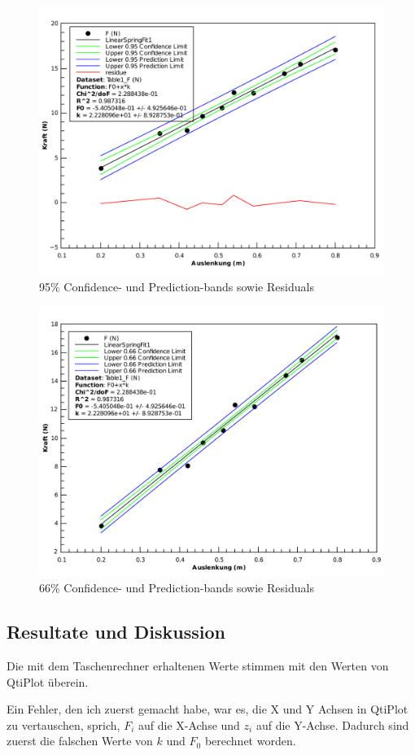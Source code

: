 \begin{figure}[H]
    \center
    \includegraphics[width=.8\textwidth]{qtiplot/feder-95-bands}
    \caption{95\% Confidence- und Prediction-bands sowie Residuals}
    \label{fig:feder-95-bands}
\end{figure}

\begin{figure}[H]
    \center
    \includegraphics[width=.8\textwidth]{qtiplot/feder-66-bands}
    \caption{66\% Confidence- und Prediction-bands sowie Residuals}
    \label{fig:feder-66-bands}
\end{figure}


\subsection{Resultate und Diskussion}

Die mit dem Taschenrechner erhaltenen Werte stimmen mit den Werten von QtiPlot \"uberein.

Ein Fehler, den ich zuerst gemacht habe, war es, die X und Y Achsen in QtiPlot zu vertauschen,
sprich, $F_i$ auf die X-Achse und $z_i$ auf die Y-Achse. Dadurch sind zuerst die falschen Werte
von $k$ und $F_0$ berechnet worden.

